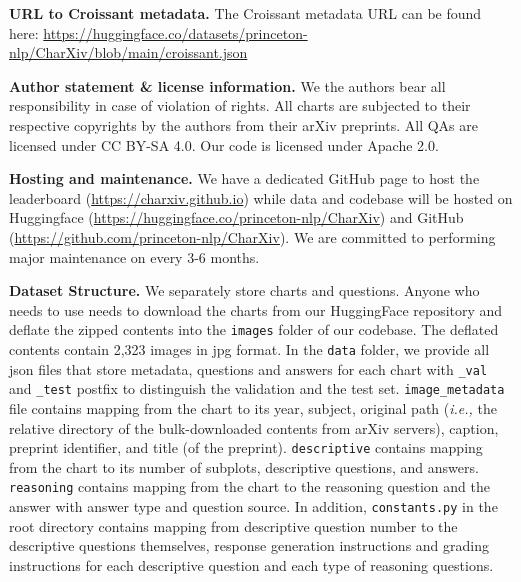 \textbf{URL to Croissant metadata.} The Croissant metadata URL can be found here: \url{https://huggingface.co/datasets/princeton-nlp/CharXiv/blob/main/croissant.json}

\textbf{Author statement \& license information.} We the authors bear all responsibility in case of violation of rights. All charts are subjected to their respective copyrights by the authors from their arXiv preprints. All QAs are licensed under CC BY-SA 4.0. Our code is licensed under Apache 2.0.

\textbf{Hosting and maintenance.} We have a dedicated GitHub page to host the leaderboard (\url{https://charxiv.github.io}) while data and codebase will be hosted on Huggingface (\url{https://huggingface.co/princeton-nlp/CharXiv}) and GitHub (\url{https://github.com/princeton-nlp/CharXiv}). We are committed to performing major maintenance on \ours{} every 3-6 months.

\textbf{Dataset Structure.} We separately store charts and questions. Anyone who needs to use \ours{} needs to download the charts from our HuggingFace repository and deflate the zipped contents into the \texttt{images} folder of our codebase. The deflated contents contain 2,323 images in jpg format. In the \texttt{data} folder, we provide all json files that store metadata, questions and answers for each chart with \texttt{\_val} and \texttt{\_test} postfix to distinguish the validation and the test set. \texttt{image\_metadata} file contains mapping from the chart to its year, subject, original path (\textit{i.e.,} the relative directory of the bulk-downloaded contents from arXiv servers), caption, preprint identifier, and title (of the preprint). \texttt{descriptive} contains mapping from the chart to its number of subplots, descriptive questions, and answers. \texttt{reasoning} contains mapping from the chart to the reasoning question and the answer with answer type and question source. In addition, \texttt{constants.py} in the root directory contains mapping from descriptive question number to the descriptive questions themselves, response generation instructions and grading instructions for each descriptive question and each type of reasoning questions.
